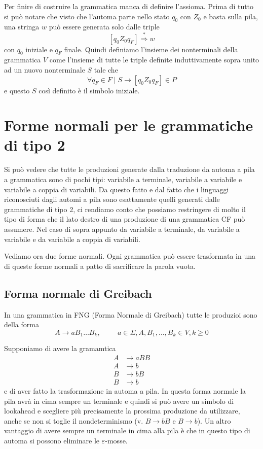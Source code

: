 \documentclass[12pt]{report}
\theoremstyle{definition}
\begin{document}
Per finire di costruire la grammatica manca di definire l'assioma.
Prima di tutto si può notare che visto che l'automa parte nello stato $q_0$ con $Z_0$ e basta sulla pila, una stringa $w$ può essere generata solo dalle triple 
$$[q_0Z_0q_F] \overset{*}{\Rightarrow} w$$
con $q_0$ iniziale e $q_F$ finale.
Quindi definiamo l'insieme dei nonterminali della grammatica $V$ come l'insieme di tutte le triple definite induttivamente sopra unito ad un nuovo nonterminale $S$ tale che
$$ \forall q_F \in F \mid S \rightarrow [q_0 Z_0 q_F] \in P $$
e questo $S$ così definito è il simbolo iniziale.

\section{Forme normali per le grammatiche di tipo 2}
Si può vedere che tutte le produzioni generate dalla traduzione da automa a pila a grammatica sono di pochi tipi: variabile a terminale, variabile a variabile e variabile a coppia di variabili.
Da questo fatto e dal fatto che i linguaggi riconosciuti dagli automi a pila sono esattamente quelli generati dalle grammatiche di tipo 2, ci rendiamo conto che possiamo restringere di molto il tipo di forma che il lato destro di una produzione di una grammatica CF può assumere.
Nel caso di sopra appunto da variabile a terminale, da variabile a variabile e da variabile a coppia di variabili.

Vediamo ora due forme normali.
Ogni grammatica può essere trasformata in una di queste forme normali a patto di sacrificare la parola vuota.

\subsection{Forma normale di Greibach}
In una grammatica in FNG (Forma Normale di Greibach) tutte le produzioi sono della forma
$$ A \rightarrow a B_1 \dots B_k, \hspace{1cm} a \in \Sigma, A, B_1, \dots, B_k \in V, k \geq 0 $$

Supponiamo di avere la gramamtica
\begin{align*}
	A &\rightarrow a B B \\
	A &\rightarrow b \\
	B &\rightarrow b B \\
	B &\rightarrow b
\end{align*}
e di aver fatto la trasformazione in automa a pila.
In questa forma normale la pila avrà in cima sempre un terminale e quindi si può avere un simbolo di lookahead e scegliere più precisamente la prossima produzione da utilizzare, anche se non si toglie il nondeterminismo (v. $B \rightarrow b B$ e $B \rightarrow b$).
Un altro vantaggio di avere sempre un terminale in cima alla pila è che in questo tipo di automa si possono eliminare le $\varepsilon$-mosse.
\end{document}
